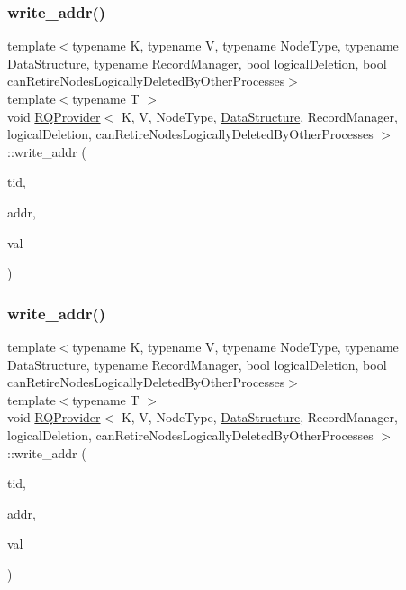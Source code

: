 \mbox{\label{classRQProvider_a2b627a253e65ffdbba9815d0ac3236cb}} 
\subsubsection{\texorpdfstring{write\+\_\+addr()}{write\_addr()}\hspace{0.1cm}{\footnotesize\ttfamily [4/5]}}
{\footnotesize\ttfamily template$<$typename K, typename V, typename Node\+Type, typename Data\+Structure, typename Record\+Manager, bool logical\+Deletion, bool can\+Retire\+Nodes\+Logically\+Deleted\+By\+Other\+Processes$>$ \\
template$<$typename T $>$ \\
void \hyperlink{classRQProvider}{R\+Q\+Provider}$<$ K, V, Node\+Type, \hyperlink{classDataStructure}{Data\+Structure}, Record\+Manager, logical\+Deletion, can\+Retire\+Nodes\+Logically\+Deleted\+By\+Other\+Processes $>$\+::write\+\_\+addr (\begin{DoxyParamCaption}\item[{const int}]{tid,  }\item[{T volatile $\ast$const}]{addr,  }\item[{const T}]{val }\end{DoxyParamCaption})\hspace{0.3cm}{\ttfamily [inline]}}

\mbox{\label{classRQProvider_a2b627a253e65ffdbba9815d0ac3236cb}} 
\subsubsection{\texorpdfstring{write\+\_\+addr()}{write\_addr()}\hspace{0.1cm}{\footnotesize\ttfamily [5/5]}}
{\footnotesize\ttfamily template$<$typename K, typename V, typename Node\+Type, typename Data\+Structure, typename Record\+Manager, bool logical\+Deletion, bool can\+Retire\+Nodes\+Logically\+Deleted\+By\+Other\+Processes$>$ \\
template$<$typename T $>$ \\
void \hyperlink{classRQProvider}{R\+Q\+Provider}$<$ K, V, Node\+Type, \hyperlink{classDataStructure}{Data\+Structure}, Record\+Manager, logical\+Deletion, can\+Retire\+Nodes\+Logically\+Deleted\+By\+Other\+Processes $>$\+::write\+\_\+addr (\begin{DoxyParamCaption}\item[{const int}]{tid,  }\item[{T volatile $\ast$const}]{addr,  }\item[{const T}]{val }\end{DoxyParamCaption})\hspace{0.3cm}{\ttfamily [inline]}}



